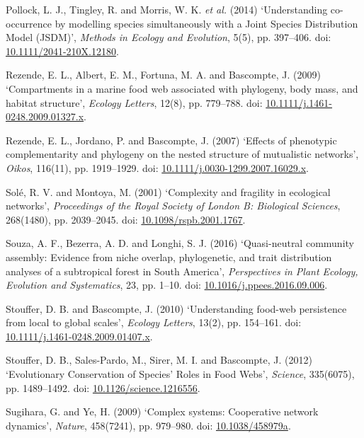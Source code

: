 \documentclass[12pt]{article}
\begin{document}
\hypertarget{ref-poll14ucm}{}
Pollock, L. J., Tingley, R. and Morris, W. K. \emph{et al.} (2014)
`Understanding co-occurrence by modelling species simultaneously with a
Joint Species Distribution Model (JSDM)', \emph{Methods in Ecology and
Evolution}, 5(5), pp. 397--406. doi:
\href{https://doi.org/10.1111/2041-210X.12180}{10.1111/2041-210X.12180}.

\hypertarget{ref-reze09cmf}{}
Rezende, E. L., Albert, E. M., Fortuna, M. A. and Bascompte, J. (2009)
`Compartments in a marine food web associated with phylogeny, body mass,
and habitat structure', \emph{Ecology Letters}, 12(8), pp. 779--788.
doi:
\href{https://doi.org/10.1111/j.1461-0248.2009.01327.x}{10.1111/j.1461-0248.2009.01327.x}.

\hypertarget{ref-reze07epc}{}
Rezende, E. L., Jordano, P. and Bascompte, J. (2007) `Effects of
phenotypic complementarity and phylogeny on the nested structure of
mutualistic networks', \emph{Oikos}, 116(11), pp. 1919--1929. doi:
\href{https://doi.org/10.1111/j.0030-1299.2007.16029.x}{10.1111/j.0030-1299.2007.16029.x}.

\hypertarget{ref-sole01cfe}{}
Solé, R. V. and Montoya, M. (2001) `Complexity and fragility in
ecological networks', \emph{Proceedings of the Royal Society of London
B: Biological Sciences}, 268(1480), pp. 2039--2045. doi:
\href{https://doi.org/10.1098/rspb.2001.1767}{10.1098/rspb.2001.1767}.

\hypertarget{ref-souz16qca}{}
Souza, A. F., Bezerra, A. D. and Longhi, S. J. (2016) `Quasi-neutral
community assembly: Evidence from niche overlap, phylogenetic, and trait
distribution analyses of a subtropical forest in South America',
\emph{Perspectives in Plant Ecology, Evolution and Systematics}, 23, pp.
1--10. doi:
\href{https://doi.org/10.1016/j.ppees.2016.09.006}{10.1016/j.ppees.2016.09.006}.

\hypertarget{ref-stou10ufp}{}
Stouffer, D. B. and Bascompte, J. (2010) `Understanding food-web
persistence from local to global scales', \emph{Ecology Letters}, 13(2),
pp. 154--161. doi:
\href{https://doi.org/10.1111/j.1461-0248.2009.01407.x}{10.1111/j.1461-0248.2009.01407.x}.

\hypertarget{ref-stou12ecs}{}
Stouffer, D. B., Sales-Pardo, M., Sirer, M. I. and Bascompte, J. (2012)
`Evolutionary Conservation of Species' Roles in Food Webs',
\emph{Science}, 335(6075), pp. 1489--1492. doi:
\href{https://doi.org/10.1126/science.1216556}{10.1126/science.1216556}.

\hypertarget{ref-sugi09csc}{}
Sugihara, G. and Ye, H. (2009) `Complex systems: Cooperative network
dynamics', \emph{Nature}, 458(7241), pp. 979--980. doi:
\href{https://doi.org/10.1038/458979a}{10.1038/458979a}.
\end{document}
